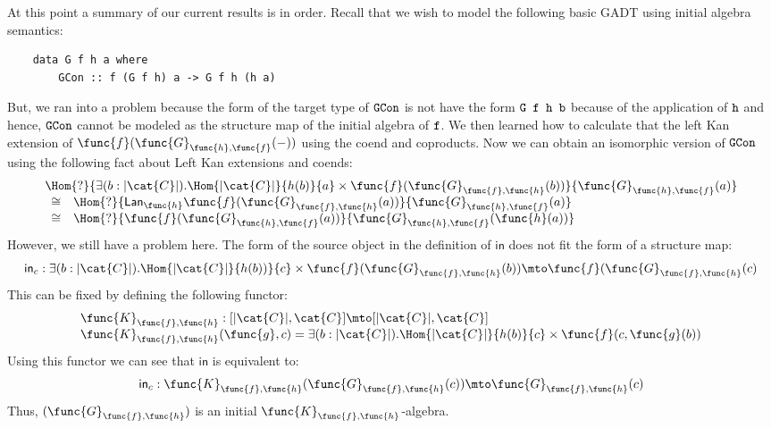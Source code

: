 At this point a summary of our current results is in order. Recall
that we wish to model the following basic GADT using initial algebra
semantics:
\begin{verbatim}
    data G f h a where
        GCon :: f (G f h) a -> G f h (h a)
\end{verbatim}
But, we ran into a problem because the form of the target type of
$\verb!GCon!$ is not have the form $\verb!G f h b!$ because of the
application of $\verb!h!$ and hence, $\verb!GCon!$ cannot be modeled
as the structure map of the initial algebra of $\verb!f!$. We then
learned how to calculate that the left Kan extension of
$\func{f}(\func{G}_{\func{h},\func{f}}(-))$ using the coend and
coproducts.  Now we can obtain an isomorphic version of $\verb!GCon!$
using the following fact about Left Kan extensions and coends:
\[
    \begin{array}{lll}
        \Hom{?}{\exists(b : |\cat{C}|).\Hom{|\cat{C}|}{h(b)}{a} \times \func{f}(\func{G}_{\func{f},\func{h}}(b))}{\func{G}_{\func{h},\func{f}}(a)}\\
        \begin{array}{lll}
            \cong &
            \Hom{?}{\Lan{\func{h}}{\func{f}(\func{G}_{\func{f},\func{h}}(a))}}{\func{G}_{\func{h},\func{f}}(a)}\\
            \cong &
            \Hom{?}{\func{f}(\func{G}_{\func{h},\func{f}}(a))}{\func{G}_{\func{h},\func{f}}(\func{h}(a))}
        \end{array}
    \end{array}
\]
However, we still have a problem here.  The form of the source object
in the definition of $\mathsf{in}$ does not fit the form of a
structure map:
\[
    \mathsf{in}_c : 
    \exists(b : |\cat{C}|).\Hom{|\cat{C}|}{h(b))}{c} \times \func{f}(\func{G}_{\func{f},\func{h}}(b))
    \mto\func{f}(\func{G}_{\func{f},\func{h}}(c)
\]
This can be fixed by defining the following functor:
\[
    \begin{array}{lll}
        \func{K}_{\func{f},\func{h}} : [|\cat{C}|,\cat{C}] \mto [|\cat{C}|,\cat{C}]\\
        \func{K}_{\func{f},\func{h}}(\func{g},c) = \exists(b : |\cat{C}|).\Hom{|\cat{C}|}{h(b)}{c} \times \func{f}(c,\func{g}(b))
    \end{array}
\]
Using this functor we can see that $\mathsf{in}$ is equivalent to:
\[
    \mathsf{in}_{c} : 
    \func{K}_{\func{f},\func{h}}(\func{G}_{\func{f},\func{h}}(c)) 
    \mto 
    \func{G}_{\func{f},\func{h}}(c)
\]
Thus, $(\func{G}_{\func{f},\func{h}})$ is an initial $\func{K}_{\func{f},\func{h}}$-algebra.

